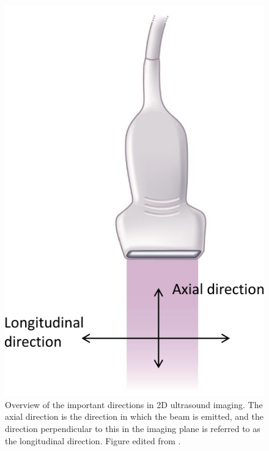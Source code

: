 \begin{figure}
	\centering
	\includegraphics[width=0.9\linewidth]{Figures/Ultrasound/us_res_probe.pdf} 
	\caption{Overview of the important directions in 2D ultrasound imaging. The axial direction is the direction in which the beam is emitted, and the direction perpendicular to this in the imaging plane is referred to as the longitudinal direction. Figure edited from \citet{martin_basic_2011}.}
	\label{fig:usresprobe}
\end{figure} \leavevmode

%




